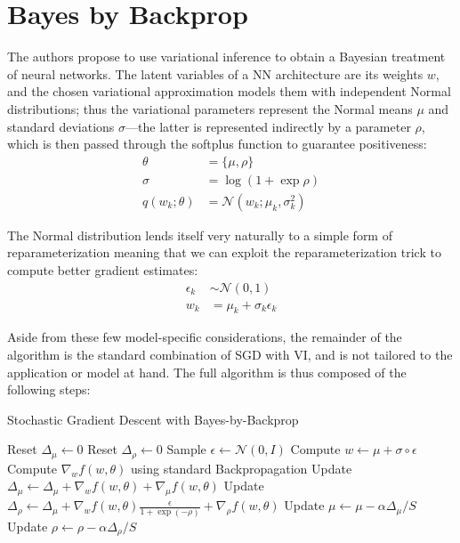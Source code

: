 \documentclass[11pt]{article}
\begin{document}
\section{Bayes by Backprop} \label{sec:bayes_by_backprop}

The authors propose to use variational inference to obtain a Bayesian treatment
of neural networks.  The latent variables of a NN architecture are its weights
$w$, and the chosen variational approximation models them with independent
Normal distributions;  thus the variational parameters represent the Normal
means $\mu$ and standard deviations $\sigma$---the latter is represented
indirectly by a parameter $\rho$, which is then passed through the softplus
function to guarantee positiveness:
%
\begin{align}
  \theta &= \{ \mu, \rho \} \\
  \sigma &= \log(1 + \exp\rho) \\
  q(w_k; \theta) &= \mathcal{N}(w_k; \mu_k, \sigma_k^2)
\end{align}


The Normal distribution lends itself very naturally to a simple form of
reparameterization meaning that we can exploit the reparameterization trick to
compute better gradient estimates:
%
\begin{align}
  \epsilon_k &\sim \mathcal{N}(0, 1) \\
  w_k &= \mu_k + \sigma_k \epsilon_k
\end{align}

Aside from these few model-specific considerations, the remainder of the
algorithm is the standard combination of SGD with VI, and is not tailored to
the application or model at hand.  The full algorithm is thus composed of the
following steps:

\begin{algorithm}
\caption{Stochastic Gradient Descent with Bayes-by-Backprop}
\begin{algorithmic}[1]
  \Repeat
  \State Reset $\Delta_\mu \gets 0$
  \State Reset $\Delta_\rho \gets 0$
  \State Sample $\epsilon \gets \mathcal{N}(0, I)$
  \State Compute $w \gets \mu + \sigma \circ \epsilon$
  \State Compute $\nabla_w f(w, \theta)$ using standard Backpropagation
  \State Update $\Delta_\mu \gets \Delta_\mu + \nabla_w f(w, \theta) + \nabla_\mu f(w, \theta)$
  \State Update $\Delta_\rho \gets \Delta_\mu + \nabla_w f(w, \theta) \frac{\epsilon}{1+\exp(-\rho)} + \nabla_\rho f(w, \theta)$
  \EndFor
  \State Update $\mu \gets \mu - \alpha \Delta_\mu / S$
  \State Update $\rho \gets \rho - \alpha \Delta_\rho / S$
\end{algorithmic}
\end{algorithm}
\end{document}
